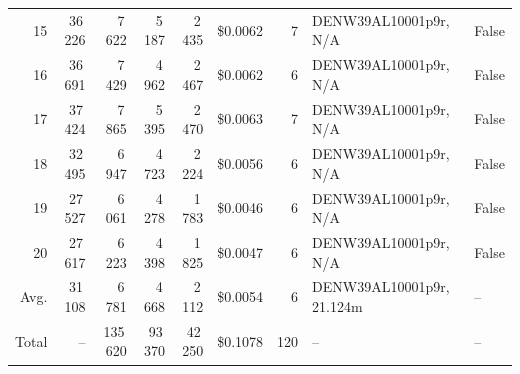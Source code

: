 \documentclass[a4paper,11pt]{article}
\begin{document}
\begin{table}[ht]
\begin{tabular}{r r r r r r r p{3cm} l}
15 & 36\,226 & 7\,622 & 5\,187 & 2\,435 & \$0.0062 & 7 & DENW39AL10001p9r, N/A & False \\
16 & 36\,691 & 7\,429 & 4\,962 & 2\,467 & \$0.0062 & 6 & DENW39AL10001p9r, N/A & False \\
17 & 37\,424 & 7\,865 & 5\,395 & 2\,470 & \$0.0063 & 7 & DENW39AL10001p9r, N/A & False \\
18 & 32\,495 & 6\,947 & 4\,723 & 2\,224 & \$0.0056 & 6 & DENW39AL10001p9r, N/A & False \\
19 & 27\,527 & 6\,061 & 4\,278 & 1\,783 & \$0.0046 & 6 & DENW39AL10001p9r, N/A & False \\
20 & 27\,617 & 6\,223 & 4\,398 & 1\,825 & \$0.0047 & 6 & DENW39AL10001p9r, N/A & False \\
\hline
Avg. & 31\,108 & 6\,781 & 4\,668 & 2\,112 & \$0.0054 & 6 & DENW39AL10001p9r, 21.124m & -- \\
Total & -- & 135\,620 & 93\,370 & 42\,250 & \$0.1078 & 120 & -- & -- \\
\hline
\end{tabular}
\end{table}

\clearpage
\end{document}
